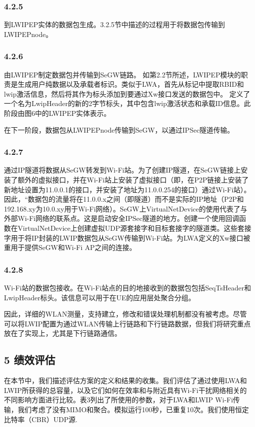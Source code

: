 \subsubsection*{4.2.5}
到LWIPEP实体的数据包生成。3.2.5节中描述的过程用于将数据包传输到LWIPEPnode。

\subsubsection*{4.2.6}
由LWIPEP制定数据包并传输到SeGW链路。
如第2.2节所述，LWIPEP模块的职责是生成用户纯数据以及承载者标识。类似于LWA，首先从标记中提取RBID和lwip激活信息，然后将其作为标头添加到要通过Xw接口发送的数据包中。
定义了一个名为LwipHeader的新的2字节标头，其中包含lwip激活状态和承载ID信息。此阶段由图6中的LWIPEP实体表示。

在下一阶段，数据包从LWIPEPnode传输到SeGW，以通过IPSec隧道传输。

\subsubsection*{4.2.7}
通过IP隧道将数据从SeGW转发到Wi-Fi站。为了创建IP隧道，在SeGW链接上安装了额外的虚拟接口，并在Wi-Fi站上安装了虚拟接口（即，在P2P链接上安装了新地址设置为11.0.0.1的接口，并安装了地址为11.0.0.254的接口）通过Wi-Fi站）。因此，“数据包的流量将在11.0.0.x之间（即隧道）而不是实际的IP地址（P2P和192.168.xy为10.0.xy用于Wi-Fi网络）。SeGW上VirtualNetDevice的使用代表了与外部Wi-Fi网络的联系点。这是启动安全IPSec隧道的地方。创建一个使用回调函数在VirtualNetDevice上创建虚拟UDP源套接字和目标套接字的隧道类。这些套接字用于将IP封装的LWIP数据包从SeGW传输到Wi-Fi站。为LWA定义的Xw接口被重用于提供SeGW和Wi-Fi AP之间的连接。


\subsubsection*{4.2.8}
Wi-Fi站的数据包接收。在Wi-Fi站点的目的地接收到的数据包包括SeqTsHeader和LwipHeader标头。该信息可以用于在UE的应用层处聚合分组。


因此，详细的WLAN测量，支持建立，修改和错误处理机制都没有被考虑。尽管可以将LWIP配置为通过WLAN传输上行链路和下行链路数据，但我们将研究重点放在了实现上，尤其是下行链路通信。

\newpage
\subsection*{5 绩效评估}
在本节中，我们描述评估方案的定义和结果的收集。我们评估了通过使用LWA和LWIP所获得的总容量，以及它们如何在效率和与附近具有Wi-Fi干扰网络相关的不同影响方面进行比较。表3列出了所使用的参数，对于LWA和LWIP Wi-Fi传输，我们考虑了没有MIMO和聚合。模拟运行100秒，已重复10次。我们使用恒定比特率（CBR）UDP源.

